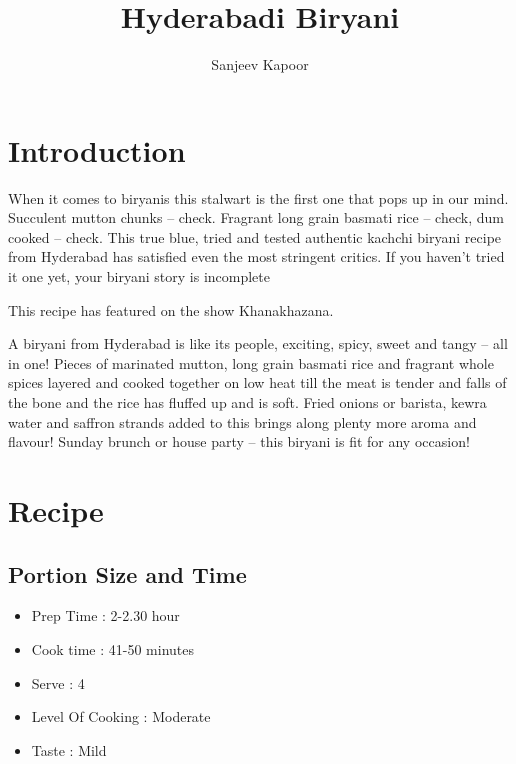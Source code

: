\documentclass{article}
\author{Sanjeev Kapoor}
\title{Hyderabadi Biryani}
\begin{document}
    \maketitle   
    \section{Introduction}
        When it comes to biryanis this stalwart is the first one that pops up in our mind. Succulent mutton chunks – check. Fragrant long grain basmati rice – check, dum cooked – check. This true blue, tried and tested authentic kachchi biryani recipe from Hyderabad has satisfied even the most stringent critics. If you haven’t tried it one yet, your biryani story is incomplete

        This recipe has featured on the show Khanakhazana.

        A biryani from Hyderabad is like its people, exciting, spicy, sweet and tangy – all in one!  Pieces of marinated mutton, long grain basmati rice and fragrant whole spices layered and cooked together on low heat till the meat is tender and falls of the bone and the rice has fluffed up and is soft.  Fried onions or barista, kewra water and saffron strands added to this brings along plenty more aroma and flavour! Sunday brunch or house party – this biryani is fit for any occasion!
    \section{Recipe}
        \subsection{Portion Size and Time}
            \begin{itemize}
                \item Prep Time : 2-2.30 hour
                \item Cook time : 41-50 minutes
                \item  Serve : 4
                \item Level Of Cooking : Moderate
                \item Taste : Mild
            \end{itemize}
\end{document}
